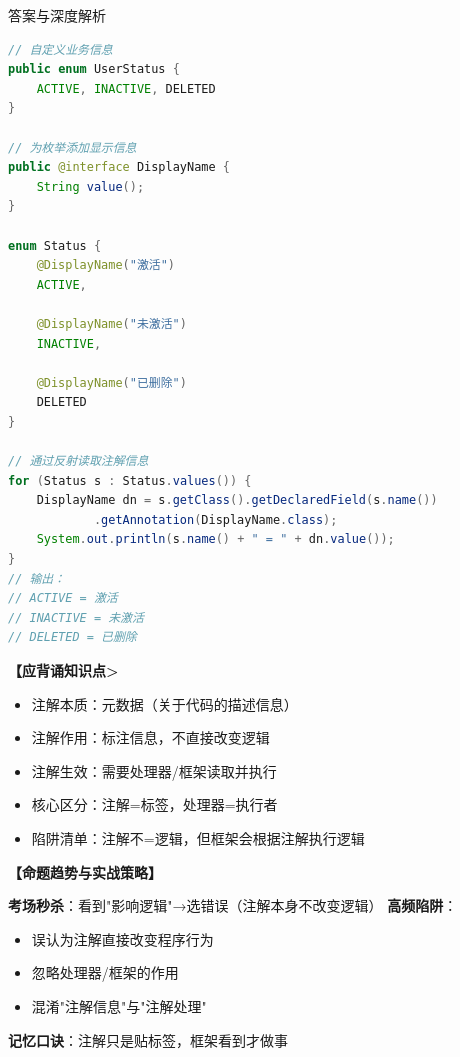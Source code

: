\documentclass[12pt, a4paper]{ctexart}
\begin{document}
\begin{enumerate}[label=\textbf{\arabic*.}]
\begin{bluebox}{答案与深度解析}
\begin{itemize}[leftmargin=*, nosep, label={}]
\begin{itemize}[label={}, leftmargin=*, nosep]
\begin{lstlisting}[language=Java]
// 自定义业务信息
public enum UserStatus {
    ACTIVE, INACTIVE, DELETED
}

// 为枚举添加显示信息
public @interface DisplayName {
    String value();
}

enum Status {
    @DisplayName("激活")
    ACTIVE,

    @DisplayName("未激活")
    INACTIVE,

    @DisplayName("已删除")
    DELETED
}

// 通过反射读取注解信息
for (Status s : Status.values()) {
    DisplayName dn = s.getClass().getDeclaredField(s.name())
            .getAnnotation(DisplayName.class);
    System.out.println(s.name() + " = " + dn.value());
}
// 输出：
// ACTIVE = 激活
// INACTIVE = 未激活
// DELETED = 已删除
				            \end{lstlisting}
			            \end{itemize}
		      \end{itemize}

		      \textbf{【应背诵知识点>}
		      \begin{itemize}[label={}, nosep]
			      \item 注解本质：元数据（关于代码的描述信息）
			      \item 注解作用：标注信息，不直接改变逻辑
			      \item 注解生效：需要处理器/框架读取并执行
			      \item 核心区分：注解=标签，处理器=执行者
			      \item 陷阱清单：注解不=逻辑，但框架会根据注解执行逻辑
		      \end{itemize}

		      \textbf{【命题趋势与实战策略】}

		      \textbf{考场秒杀}：看到"影响逻辑"→选错误（注解本身不改变逻辑）
		      \textbf{高频陷阱}：
		      \begin{itemize}[label={}, nosep]
			      \item 误认为注解直接改变程序行为
			      \item 忽略处理器/框架的作用
			      \item 混淆"注解信息"与"注解处理"
		      \end{itemize}
		      \textbf{记忆口诀}：注解只是贴标签，框架看到才做事
	      \end{bluebox}

	      \vspace{1em}

\end{enumerate}
\end{document}
